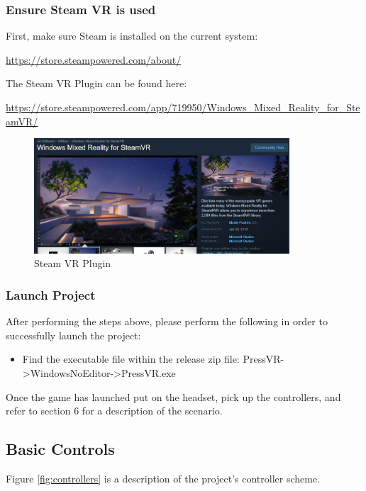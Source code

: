 \documentclass[onecolumn, draftclsnofoot,10pt, compsoc]{IEEEtran}
\begin{document}
\subsubsection{Ensure Steam VR is used}

First, make sure Steam is installed on the current system:

\noindent
\href{https://store.steampowered.com/about/}{https://store.steampowered.com/about/}

\noindent
The Steam VR Plugin can be found here: 

\noindent 
\href{https://store.steampowered.com/app/719950/Windows_Mixed_Reality_for_SteamVR/}{https://store.steampowered.com/app/719950/Windows\_Mixed\_Reality\_for\_SteamVR/}\\

\begin{figure}[ht!]
    \centering
    \includegraphics[width=0.85\textwidth]{steamplugin.JPG}
    \caption{Steam VR Plugin}
    \label{fig:printerModel}
\end{figure}

\subsubsection{Launch Project}

After performing the steps above, please perform the following in order to successfully launch the project: 
\begin{itemize}
    \item Find the executable file within the release zip file: PressVR->WindowsNoEditor->PressVR.exe
\end{itemize}

Once the game has launched put on the headset, pick up the controllers, and refer to section 6 for a description of the scenario.


\subsection{Basic Controls}
 Figure \ref{fig:controllers} is a description of the project's controller scheme.
\end{document}
